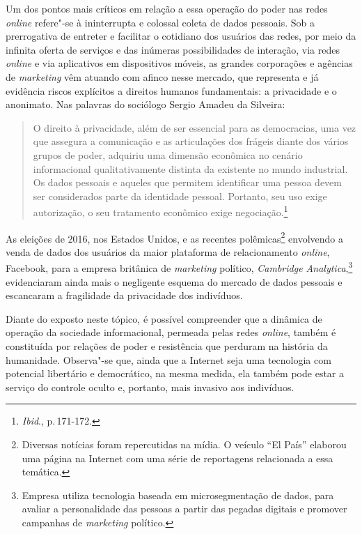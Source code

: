 Um dos pontos mais críticos em relação a essa operação do poder nas
redes \emph{online} refere"-se à ininterrupta e colossal coleta de dados
pessoais. Sob a prerrogativa de entreter e facilitar o cotidiano dos
usuários das redes, por meio da infinita oferta de serviços e das
inúmeras possibilidades de interação, via redes \emph{online} e via aplicativos
em dispositivos móveis, as grandes corporações e agências de \emph{marketing}
vêm atuando com afinco nesse mercado, que representa e já evidência
riscos explícitos a direitos humanos fundamentais: a privacidade e o
anonimato. Nas palavras do sociólogo Sergio Amadeu da Silveira:

\begin{quote}
O direito à privacidade, além de ser essencial para as democracias, uma
vez que assegura a comunicação e as articulações dos frágeis diante dos
vários grupos de poder, adquiriu uma dimensão econômica no cenário
informacional qualitativamente distinta da existente no mundo
industrial. Os dados pessoais e aqueles que permitem identificar uma
pessoa devem ser considerados parte da identidade pessoal. Portanto, seu
uso exige autorização, o seu tratamento econômico exige negociação.\footnote{\textit{Ibid}., p.\,171-172.}
\end{quote}

As eleições de 2016, nos Estados Unidos, e as recentes
polêmicas\footnote{Diversas notícias foram repercutidas na mídia. O
  veículo ``El País'' elaborou uma página na Internet com uma série de
  reportagens relacionada a essa temática.} envolvendo a venda de dados
dos usuários da maior plataforma de relacionamento \emph{online}, Facebook,
para a empresa britânica de \emph{marketing} político, \emph{Cambridge
Analytica},\footnote{Empresa utiliza tecnologia baseada em
  microsegmentação de dados, para avaliar a personalidade das pessoas a
  partir das pegadas digitais e promover campanhas de \emph{marketing}
  político.} evidenciaram ainda mais o negligente esquema do
mercado de dados pessoais e escancaram a fragilidade da privacidade dos
indivíduos.

Diante do exposto neste tópico, é possível compreender que a dinâmica de
operação da sociedade informacional, permeada pelas redes \emph{online}, também
é constituída por relações de poder e resistência que perduram na
história da humanidade. Observa"-se que, ainda que a Internet seja uma
tecnologia com potencial libertário e democrático, na mesma medida, ela
também pode estar a serviço do controle oculto e, portanto, mais
invasivo aos indivíduos.

